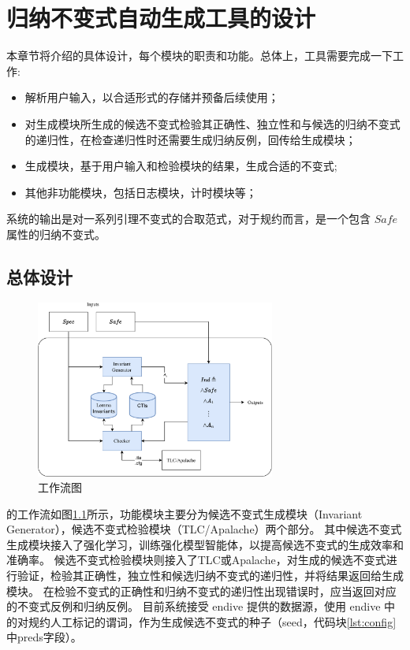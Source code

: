 \chapter{归纳不变式自动生成工具的设计}\label{chap:design}

本章节将介绍\rltla 的具体设计，每个模块的职责和功能。总体上，工具需要完成一下工作:
\begin{itemize}
    \item 解析用户输入，以合适形式的存储并预备后续使用；
    \item 对生成模块所生成的候选不变式检验其正确性、独立性和与候选的归纳不变式的递归性，在检查递归性时还需要生成归纳反例，回传给生成模块；
    \item 生成模块，基于用户输入和检验模块的结果，生成合适的不变式;
    \item 其他非功能模块，包括日志模块，计时模块等；
\end{itemize}
系统的输出是对一系列引理不变式的合取范式，对于规约而言，是一个包含 $Safe$ 属性的归纳不变式。

\section{总体设计}
\begin{figure}[h]
    \centering
    \includegraphics[width=0.7\textwidth]{figures/workflow.pdf}
    \caption{\rltla 工作流图}
    \label{fig:rltla}
\end{figure}

\rltla 的工作流如图\ref{fig:rltla}所示，功能模块主要分为候选不变式生成模块（Invariant Generator），候选不变式检验模块（TLC/Apalache）两个部分。
其中候选不变式生成模块接入了强化学习，训练强化模型智能体，以提高候选不变式的生成效率和准确率。
候选不变式检验模块则接入了TLC或Apalache，对生成的候选不变式进行验证，检验其正确性，独立性和候选归纳不变式的递归性，并将结果返回给生成模块。
在检验不变式的正确性和归纳不变式的递归性出现错误时，应当返回对应的不变式反例和归纳反例。
目前系统接受 endive 提供的数据源，使用 endive 中的对规约人工标记的谓词，作为生成候选不变式的种子（seed，代码块\ref{lst:config}中preds字段）。


